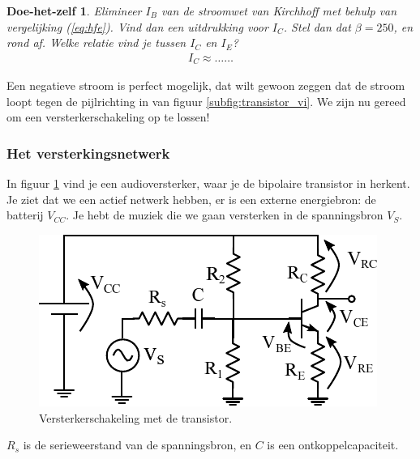 \documentclass{article}
\newtheorem{DIY}{Doe-het-zelf}
\begin{document}
				\begin{DIY} Elimineer $I_B$ van de stroomwet van Kirchhoff met behulp van vergelijking (\ref{eq:hfe}). Vind dan een uitdrukking voor $I_C$. Stel dan dat $\beta = 250$, en rond af. Welke relatie vind je tussen $I_C$ en $I_E$? 
				\begin{align*}
				    I_C \approx \ldots \ldots
				\end{align*}
				\end{DIY}
				Een negatieve stroom is perfect mogelijk, dat wilt gewoon zeggen dat de stroom loopt tegen de pijlrichting in van figuur \ref{subfig:transistor_vi}. We zijn nu gereed om een versterkerschakeling op te lossen!

			\subsubsection{Het versterkingsnetwerk}
				In figuur \ref{fig:ges} vind je een audioversterker, waar je de bipolaire transistor in herkent. Je ziet dat we een actief netwerk hebben, er is een externe energiebron: de batterij $V_{CC}$. Je hebt de muziek die we gaan versterken in de spanningsbron $V_S$.

				\begin{figure}[htbp]
					\centering
					\includegraphics{ges}
					\caption{Versterkerschakeling met de transistor.}
					\label{fig:ges}
				\end{figure}

				$R_s$ is de serieweerstand van de spanningsbron, en $C$ is een ontkoppelcapaciteit.

\end{document}
